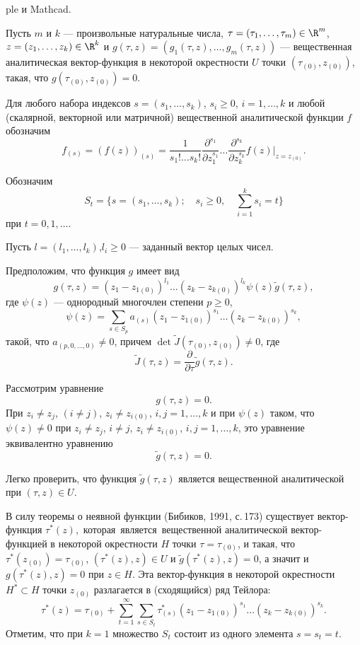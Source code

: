 ple
и Mathcad.

Пусть $m$ и $k$ --- произвольные натуральные числа,
    $\tau=(\tau_1,\ldots,\tau_m) \in {\R}^m$, $z=(z_1,\ldots,z_k)\in
{\R}^k$ и $g(\tau,z)=(g_1(\tau,z), \ldots,g_m(\tau,z))$ ---
вещественная аналитическая вектор-функция в некоторой окрестности
$U$ точки $(\tau_{(0)},z_{(0)})$, такая, что
$g(\tau_{(0)},z_{(0)})=0$.

Для любого набора индексов $s=(s_1,\ldots,s_k)$, $s_i\geq 0$,
    $i=1,\ldots,k$ и любой (скалярной, векторной или матричной)
    вещественной аналитической функции $f$ обозначим
    $$
    f_{(s)}=\left(f(z)\right)_{(s)}=\frac{1}{s_1!\ldots s_k!}
    \frac{\partial^{s_1}}{\partial z_1^{s_1}}\ldots
    \frac{\partial^{s_k}}{\partial z_k^{s_k}} f(z)|_{z=z_{(0)}}.
    $$

    Обозначим
    $$
    S_t=\{s=(s_1,\ldots,s_k);\quad s_i\geq 0,\quad \sum^k_{i=1} s_i=t\}
    $$
    при $t=0,1,\ldots$.

    Пусть $l=(l_1,\ldots,l_k)$,$l_i\geq 0$ --- заданный вектор целых
    чисел.

    Предположим, что функция $g$ имеет вид
    $$
    g(\tau,z)=(z_1-z_{1(0)})^{l_1}\ldots (z_k-z_{k(0)})^{l_k}
    \psi(z)\tilde g(\tau,z),
    $$
    где $\psi(z)$ --- однородный многочлен степени $p\geq 0$,
    $$
    \psi(z)=\sum_{s\in S_p}a_{(s)}(z_1-z_{1(0)})^{s_1}\ldots
    (z_k-z_{k(0)})^{s_k},
    $$
    такой, что $a_{(p,0,\ldots,0)}\ne 0$, причем $\det \tilde
    J(\tau_{(0)},z_{(0)})\ne 0$, где
    $$
    \tilde J(\tau,z)=\frac{\partial}{\partial\tau}\tilde g(\tau,z).
    $$

    Рассмотрим уравнение
    $$
    g(\tau,z)=0.
    $$
    При $z_i\ne z_j$, $(i\ne j)$, $z_i\ne z_{i(0)}$, $i,j=1,\ldots,k$ и
    при $\psi(z)$ таком, что $\psi(z)\ne 0$ при $z_i\ne z_j$, $i\ne j$,
    $z_i\ne z_{i(0)}$, $i,j=1,\ldots,k$, это уравнение эквивалентно
    уравнению
    $$
    \tilde g(\tau,z)=0.
    $$

    Легко проверить, что функция $\tilde g(\tau,z)$ является
    вещественной аналитической при $(\tau,z)\in U$.

    В силу теоремы о неявной функции (Бибиков, 1991, с.\,173) существует
    вектор-функция $\tau^*(z)$,\, которая\, является\,
    ве\-ще\-ст\-вен\-ной аналитической вектор-функцией в некоторой
    окрестности $H$ точки $\tau=\tau_{(0)}$, и такая, что
    $\tau^*(z_{(0)})=\tau_{(0)}$, $(\tau^*(z),z)\in U$ и $\tilde
    g(\tau^*(z),z)=0$, а значит и $ g(\tau^*(z),z)=0$ при $z\in H$. Эта
    вектор-функция в некоторой окрестности $H^*\subset H$ точки
    $z_{(0)}$ разлагается в (сходящийся) ряд Тейлора:
    $$
    \tau^*(z)=\tau_{(0)}+ \sum^\infty_{t=1}\sum_{s\in S_t}
    \tau^*_{(s)}(z_1- z_{1(0)})^{s_1}\ldots(z_k-z_{k(0)})^{s_k}.
    $$
    Отметим, что при $k=1$ множество $S_t$ состоит из одного элемента
    $s=s_t=t$.

